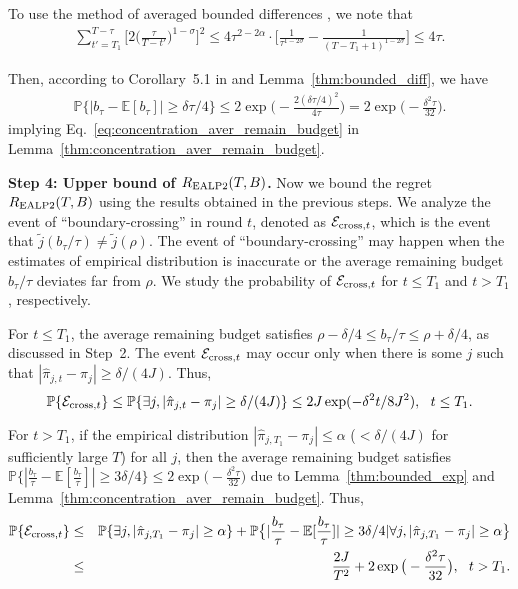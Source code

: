 To use the method of averaged bounded differences  \cite{Dubhashi2009Concentration}, we note that
\begin{eqnarray}
\sum_{t' = T_1}^{T-\tau}\bigg[2\big(\frac{\tau}{T- t'}\big)^{1-\sigma}\bigg]^2 \leq 4\tau^{2-2\alpha}\cdot\big[\frac{1}{\tau^{1-2\sigma}} - \frac{1}{(T-T_1+1)^{1-2\sigma}}\big]\leq 4\tau.
\end{eqnarray}

Then, according to  Corollary~5.1 in \cite{Dubhashi2009Concentration} and Lemma~\ref{thm:bounded_diff}, we have
\begin{eqnarray}%
\mathbb{P}\big\{|b_\tau - \mathbb{E}[b_\tau]| \geq \delta\tau/4\big\} \leq 2\exp\big(-\frac{2(\delta\tau/4)^2}{4\tau}\big)= 2\exp\big(-\frac{\delta^2\tau}{32}\big). \nonumber
\end{eqnarray}
implying Eq.~\eqref{eq:concentration_aver_remain_budget} in Lemma~\ref{thm:concentration_aver_remain_budget}.

\textbf{Step 4: Upper bound of $R_{\rm EALP2}(T,B)$.} Now we bound the regret $R_{\rm EALP2}(T,B)$ using the results obtained in the previous steps.  We analyze the event of ``boundary-crossing'' in round $t$, denoted as $\mathcal{E}_{{\rm cross},t}$, which is the event that $\tilde{j}(b_\tau/\tau) \neq \tilde{j}(\rho)$. The event of ``boundary-crossing'' may happen when the estimates of empirical distribution is inaccurate or the average remaining budget $b_\tau/\tau$ deviates far from $\rho$. We study the probability of $\mathcal{E}_{{\rm cross},t}$ for $t \leq T_1$ and $t > T_1$, respectively.

For $t \leq T_1$, the average remaining budget satisfies $\rho - \delta/4 \leq b_\tau/\tau \leq \rho + \delta/4$, as discussed in Step~2. The event  $\mathcal{E}_{{\rm cross},t}$ may occur only when there is some $j$ such that $|\hat{\pi}_{j,t} - \pi_j| \geq \delta/(4J)$. Thus,
\begin{equation}
\mathbb{P}\{\mathcal{E}_{{\rm cross},t}\} \leq \mathbb{P}\{\exists j,  |\hat{\pi}_{j,t} - \pi_j| \geq \delta/(4J)\}\leq 2J\exp(-\delta^2t/8J^2), ~~t \leq T_1.
\end{equation}

For $t > T_1$, if the empirical distribution $|\hat{\pi}_{j,T_1} - \pi_j| \leq \alpha$ ($< \delta/(4J)$ for sufficiently large $T$) for all $j$, then the average remaining budget satisfies $\mathbb{P}\big\{|\frac{b_\tau}{\tau} - \mathbb{E}[\frac{b_\tau}{\tau}]| \geq 3\delta/4\big\} \leq 2\exp\big(-\frac{\delta^2\tau}{32}\big)$ due to Lemma~\ref{thm:bounded_exp} and Lemma~\ref{thm:concentration_aver_remain_budget}. Thus,
\begin{eqnarray}
\mathbb{P}\{\mathcal{E}_{{\rm cross},t}\} &\leq& \mathbb{P}\{\exists j,  |\hat{\pi}_{j,T_1} - \pi_j| \geq \alpha\} + \mathbb{P}\big\{|\frac{b_\tau}{\tau} - \mathbb{E}[\frac{b_\tau}{\tau}]| \geq 3\delta/4|\forall j,  |\hat{\pi}_{j,T_1} - \pi_j| \geq \alpha\big\}\nonumber\\
&\leq& \frac{2J}{T^2} + 2\exp\big(-\frac{\delta^2\tau}{32}\big), ~~t > T_1.
\end{eqnarray}

